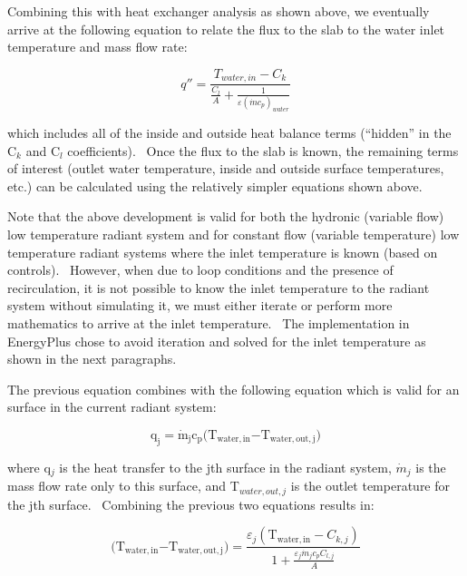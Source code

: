 Combining this with heat exchanger analysis as shown above, we eventually arrive at the following equation to relate the flux to the slab to the water inlet temperature and mass flow rate:

\begin{equation}
q'' = \frac{{{T_{water,in}} - {C_k}}}{{\frac{{{C_l}}}{A} + \frac{1}{{\varepsilon {{\left( {\dot m{c_p}} \right)}_{water}}}}}}
\end{equation}

which includes all of the inside and outside heat balance terms (``hidden'' in the C\(_{k}\) and C\(_{l}\) coefficients).~ Once the flux to the slab is known, the remaining terms of interest (outlet water temperature, inside and outside surface temperatures, etc.) can be calculated using the relatively simpler equations shown above.

Note that the above development is valid for both the hydronic (variable flow) low temperature radiant system and for constant flow (variable temperature) low temperature radiant systems where the inlet temperature is known (based on controls).~ However, when due to loop conditions and the presence of recirculation, it is not possible to know the inlet temperature to the radiant system without simulating it, we must either iterate or perform more mathematics to arrive at the inlet temperature.~ The implementation in EnergyPlus chose to avoid iteration and solved for the inlet temperature as shown in the next paragraphs.

The previous equation combines with the following equation which is valid for an surface in the current radiant system:

\begin{equation}
{{\mathrm{q}}_{\mathrm{j}}}{\mathrm{  =  }}{{\mathrm{\dot m}}_{\mathrm{j}}}{{\mathrm{c}}_{\mathrm{p}}}{\mathrm{(}}{{\mathrm{T}}_{{\mathrm{water,in}}}}{\mathrm{  -  }}{{\mathrm{T}}_{{\mathrm{water,out,j}}}}{\mathrm{)}}
\end{equation}

where q\(_{j}\) is the heat transfer to the jth surface in the radiant system, \(\dot{m}_{j}\) is the mass flow rate only to this surface, and T\(_{water,out,j}\) is the outlet temperature for the jth surface.~ Combining the previous two equations results in:

\begin{equation}
{\mathrm{(}}{{\mathrm{T}}_{{\mathrm{water,in}}}}{\mathrm{  -  }}{{\mathrm{T}}_{{\mathrm{water,out,j}}}}{\mathrm{)}} = \frac{{{\varepsilon_j}\left( {{{\mathrm{T}}_{{\mathrm{water,in}}}} - {C_{k,j}}} \right)}}{{1 + \frac{{{\varepsilon_j}{{\dot m}_j}{c_p}{C_{l,j}}}}{A}}}
\end{equation}

